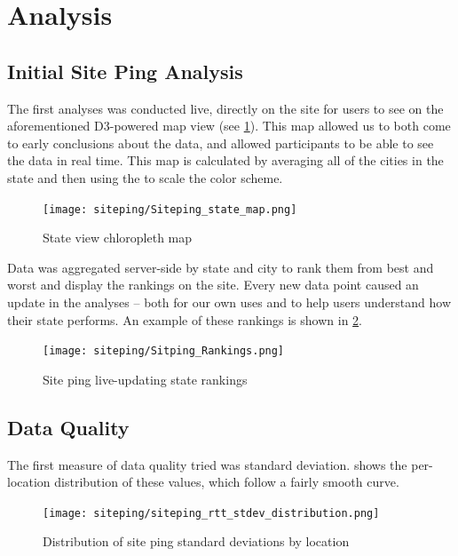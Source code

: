 \section{Analysis}\label{sec:results_web_ping}


\subsection{Initial Site Ping Analysis}

The first analyses was conducted live, directly on the site for users to see on the aforementioned D3-powered map view (see \cref{fig:siteping_state_view}). This map allowed us to both come to early conclusions about the data, and allowed participants to be able to see the data in real time. This map is calculated by averaging all of the cities in the state and then using the \iqr to scale the color scheme. 

\begin{figure}
    \centering
    \texttt{[image: siteping/Siteping\_state\_map.png]}
    \caption{State view chloropleth map}
    \label{fig:siteping_state_view}
\end{figure}

Data was aggregated server-side by state and city to rank them from best and worst and display the rankings on the site. Every new data point caused an update in the analyses -- both for our own uses and to help users understand how their state performs. An example of these rankings is shown in \cref{fig:siteping_rankings}.

\begin{figure}[h]
    \centering
    \texttt{[image: siteping/Sitping\_Rankings.png]}
    \caption{Site ping live-updating state rankings}
    \label{fig:siteping_rankings}
\end{figure}

\subsection{Data Quality}

The first measure of data quality tried was standard deviation.  shows the per-location distribution of these values, which follow a fairly smooth curve.

\begin{figure}[h]
    \centering
    \texttt{[image: siteping/siteping\_rtt\_stdev\_distribution.png]}
    \caption{Distribution of site ping standard deviations by location}
    \label{fig:siteping_stdev_dist}
\end{figure}

